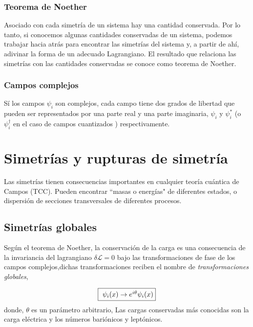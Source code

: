 \documentclass[12pt]{article}
\begin{document}

\subsubsection{Teorema de Noether}

Asociado con cada simetría de un sistema hay una cantidad conservada. Por lo tanto, si conocemos algunas cantidades conservadas de un sistema, podemos trabajar hacia atrás para encontrar las simetrías del sistema y, a partir de ahí, adivinar la forma de un adecuado Lagrangiano. El resultado que relaciona las simetrías con las cantidades conservadas se conoce como teorema de Noether. 

\subsubsection{Campos complejos}

Sí los campos $\psi_i$ son complejos, cada campo tiene dos grados de libertad que pueden ser representados por una parte real y una parte imaginaria, $\psi_i$ y $\psi_i^ *$ (o $\psi_i^\dagger$ en el caso de campos cuantizados ) respectivamente. 

\section{Simetrías y rupturas de simetría}

Las simetrías tienen consecuencias importantes en cualquier teoría cuántica de Campos (TCC). Pueden encontrar ``masas o energías"
de diferentes estados, o dispersión de secciones transversales de diferentes procesos. 

\subsection{Simetrías globales}

Según el teorema de Noether, la conservación de la carga es una consecuencia de la invariancia del lagrangiano $\delta \mathcal{L}=0 $ bajo las transformaciones de fase de los campos complejos,dichas transformaciones reciben el nombre de \textit{transformaciones globales}, 

\begin{equation}
   \fbox{ $ \psi_i(x) \rightarrow e ^ {i\theta}\psi_i(x)$}
   \label{eq:gaugeglobal}
\end{equation} 
donde, $\theta $ es un parámetro arbitrario,  Las cargas conservadas más conocidas son la carga eléctrica y los números bariónicos y leptónicos.\\  
\end{document}
